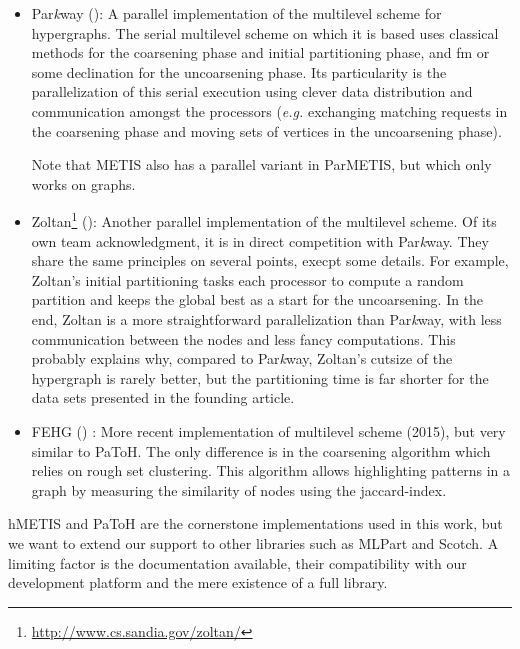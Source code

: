 \documentclass[11pt,a4paper]{report} %
\theoremstyle{customdef}
\begin{document}
\begin{itemize}
	\item Par\textit{k}way (\citet{Trifunovic2004}): A parallel implementation of the multilevel scheme for hypergraphs.
	The serial multilevel scheme on which it is based uses classical methods for the coarsening phase and initial partitioning phase, and \gls{fm} or some declination for the uncoarsening phase.
	Its particularity is the parallelization of this serial execution using clever data distribution and communication amongst the processors (\textit{e.g.} exchanging matching requests in the coarsening phase and moving sets of vertices in the uncoarsening phase).

	Note that METIS also has a parallel variant in ParMETIS, but which only works on graphs.
	
	\item Zoltan\footnote{\url{http://www.cs.sandia.gov/zoltan/}} (\citet{Devine2006}): Another parallel implementation of the multilevel scheme.
	Of its own team acknowledgment, it is in direct competition with Par\textit{k}way.
	They share the same principles on several points, execpt some details.
	For example, Zoltan's initial partitioning tasks each processor to compute a random partition and keeps the global best as a start for the uncoarsening.
	In the end, Zoltan is a more straightforward parallelization than Par\textit{k}way, with less communication between the nodes and less fancy computations.
	This probably explains why, compared to Par\textit{k}way, Zoltan's cutsize of the hypergraph is rarely better, but the partitioning time is far shorter for the data sets presented in the founding article.
	\item FEHG (\citet{Lotfifar2015}) : More recent implementation of multilevel scheme (2015), but very similar to PaToH.
	The only difference is in the coarsening algorithm which relies on rough set clustering.
	This algorithm allows highlighting patterns in a graph by measuring the similarity of nodes using the \gls{jaccard-index}.
\end{itemize}

hMETIS and PaToH are the cornerstone implementations used in this work, but we want to extend our support to other libraries such as MLPart and Scotch.
A limiting factor is the documentation available, their compatibility with our development platform and the mere existence of a full library.
\end{document}
